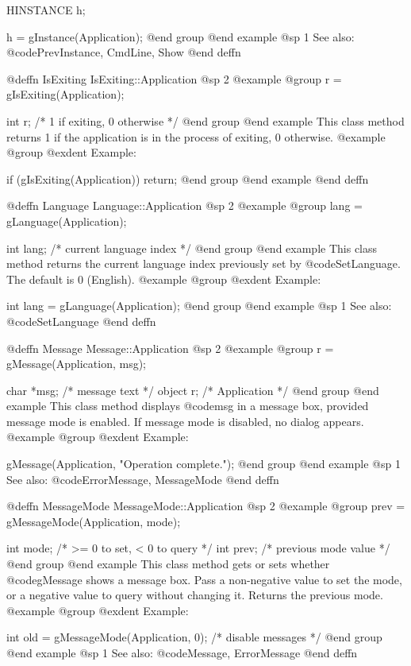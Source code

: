 HINSTANCE  h;

h = gInstance(Application);
@end group
@end example
@sp 1
See also:  @code{PrevInstance, CmdLine, Show}
@end deffn



@deffn {IsExiting} IsExiting::Application
@sp 2
@example
@group
r = gIsExiting(Application);

int     r;      /*  1 if exiting, 0 otherwise  */
@end group
@end example
This class method returns 1 if the application is in the process of
exiting, 0 otherwise.
@example
@group
@exdent Example:

if (gIsExiting(Application))
    return;
@end group
@end example
@end deffn



@deffn {Language} Language::Application
@sp 2
@example
@group
lang = gLanguage(Application);

int     lang;   /*  current language index  */
@end group
@end example
This class method returns the current language index previously set
by @code{SetLanguage}.  The default is 0 (English).
@example
@group
@exdent Example:

int lang = gLanguage(Application);
@end group
@end example
@sp 1
See also:  @code{SetLanguage}
@end deffn



@deffn {Message} Message::Application
@sp 2
@example
@group
r = gMessage(Application, msg);

char    *msg;   /*  message text  */
object  r;      /*  Application   */
@end group
@end example
This class method displays @code{msg} in a message box, provided
message mode is enabled.  If message mode is disabled, no dialog
appears.
@example
@group
@exdent Example:

gMessage(Application, "Operation complete.");
@end group
@end example
@sp 1
See also:  @code{ErrorMessage, MessageMode}
@end deffn



@deffn {MessageMode} MessageMode::Application
@sp 2
@example
@group
prev = gMessageMode(Application, mode);

int     mode;   /*  >= 0 to set, < 0 to query  */
int     prev;   /*  previous mode value         */
@end group
@end example
This class method gets or sets whether @code{gMessage} shows a
message box.  Pass a non-negative value to set the mode, or a
negative value to query without changing it.  Returns the previous
mode.
@example
@group
@exdent Example:

int old = gMessageMode(Application, 0);  /* disable messages */
@end group
@end example
@sp 1
See also:  @code{Message, ErrorMessage}
@end deffn



